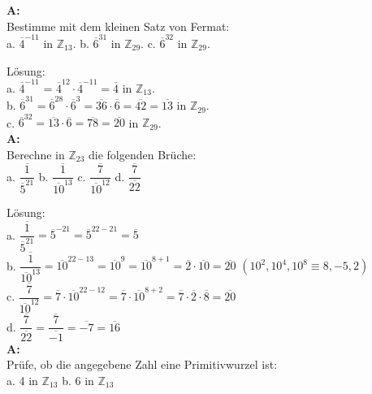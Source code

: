 \documentclass[landscape,twocolumn,a4paper]{article}
\begin{document}
\textbf{A:}   \\
Bestimme mit dem kleinen Satz von Fermat: \\
 a.  $\overline{4}^{-11}$ in  $\mathbb{Z}_{13}$. \quad
 b.  $\overline{6}^{31}$ in  $\mathbb{Z}_{29}$. \quad
 c.  $ \overline{6}^{32}$ in  $\mathbb{Z}_{29}$. 
\bigskip {}

Lösung: \\
a. $\overline{4}^{-11}$ = $\overline{4}^{12} \cdot \overline{4}^{-11} = \overline{4}$ in  $\mathbb{Z}_{13}$. \\
b. $\overline{6}^{31} =  \overline{6}^{28} \cdot  \overline{6}^{3} = \overline{36} \cdot \overline{6} = \overline{42} =  \overline{13} \text{ in } \mathbb{Z}_{29}$. \\
 c.  $ \overline{6}^{32} =  \overline{13} \cdot  \overline{6} =  \overline{78} =  \overline{20}$ in  $\mathbb{Z}_{29}$.\\ 

\textbf{A:}   \\
Berechne in $\mathbb{Z}_{23}$ die folgenden Brüche: \\
a.  $\dfrac{\overline{1}}{\overline{5}^{21}} $ \quad
b.  $\dfrac{\overline{1}}{\overline{10}^{13}} $ \quad
c.  $\dfrac{\overline{7}}{\overline{10}^{12}} $ \quad
d.  $\dfrac{\overline{7}}{\overline{22}} $ 
\bigskip  {}

Lösung: \\
a.  $\dfrac{\overline{1}}{\overline{5}^{21}}  = \overline{5}^{-21} = \overline{5}^{22-21} = \overline{5}$ \\
b. $\dfrac{\overline{1}}{\overline{10}^{13}} =  \overline{10}^{22-13} =  \overline{10}^{9} = \overline{10}^{8+1}
=   \overline{2} \cdot \overline{10}= \overline{20}$ \quad $(10^2, 10^4,10^8 \equiv 8,-5,2)$ \\
c.  $\dfrac{\overline{7}}{\overline{10}^{12}} = \overline{7} \cdot \overline{10}^{22-12} = \overline{7} \cdot \overline{10}^{8+2} =  \overline{7} \cdot \overline{2} \cdot \overline{8} = \overline{20}$   \\
d.  $\dfrac{\overline{7}}{\overline{22}} = \dfrac{\overline{7}}{\overline{-1}} =  \overline{-7} = \overline{16}$  \\

 
\textbf{A:}   \\
Prüfe, ob die angegebene Zahl eine Primitivwurzel ist: \\
 a. 4 in  $\mathbb{Z}_{13}$ \quad  b. 6 in  $\mathbb{Z}_{13}$
\bigskip {}
\end{document}
